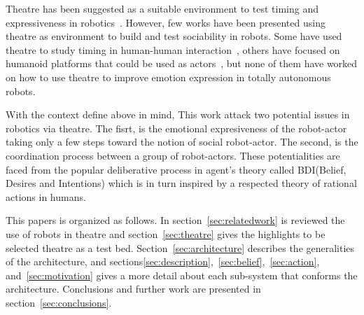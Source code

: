Theatre has been suggested as a suitable environment to test timing and expressiveness in robotics~\cite{Breazeal2003,Fan2013,Hoffman2009,lu2011position,Pinhanez97}. However, few works have been presented using theatre as environment to build and test sociability in robots. Some have used theatre to study timing in human-human interaction~\cite{Knight2011,Knight2011b}, others have focused on humanoid platforms that could be used as actors~\cite{Fan2009,Fan2013}, but none of them have worked on how to use theatre to improve emotion expression in totally autonomous robots.

With the context define above in mind, This work attack two potential issues in robotics via theatre. The fisrt, is the emotional expresiveness of the robot-actor taking only a few steps toward the notion of social robot-actor. The second, is the coordination process between a group of robot-actors. These potentialities are faced from the popular deliberative process in agent's theory called BDI(Belief, Desires and Intentions) which is in turn inspired by a respected theory of rational actions in humans. 

This papers is organized as follows. In section~\ref{sec:relatedwork} is reviewed the use of robots in theatre and section~\ref{sec:theatre} gives the highlights to be selected theatre as a test bed. Section~\ref{sec:architecture} describes the generalities of the architecture, and sections\ref{sec:description},~\ref{sec:belief},~\ref{sec:action}, and~\ref{sec:motivation} gives a more detail about each sub-system that conforms the architecture. Conclusions and further work are presented in section~\ref{sec:conclusions}. 

